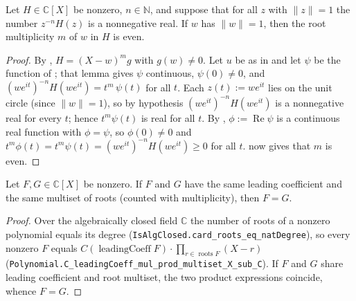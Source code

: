 \begin{lemma}
    \label{lem:circle-root-even}
    Let $H \in \mathbb{C}[X]$ be nonzero, $n \in \mathbb{N}$, and suppose that
    for all $z$ with $\|z\| = 1$ the number $z^{-n}H(z)$ is a nonnegative real.
    If $w$ has $\|w\| = 1$, then the root multiplicity $m$ of $w$ in $H$ is even.
\end{lemma}
\begin{proof}
    By , $H = (X - w)^{m} g$ with $g(w) \neq 0$.
    Let $u$ be as in  and let $\psi$ be the function of
    ; that lemma gives $\psi$ continuous,
    $\psi(0) \neq 0$, and $(w e^{i t})^{-n} H(w e^{i t}) = t^{m}\,\psi(t)$ for all
    $t$. Each $z(t) := w e^{i t}$ lies on the unit circle (since $\|w\| = 1$), so
    by hypothesis $(w e^{i t})^{-n} H(w e^{i t})$ is a nonnegative real for every
    $t$; hence $t^{m}\psi(t)$ is real for all $t$. By ,
    $\phi := \operatorname{Re}\psi$ is a continuous real function with
    $\phi = \psi$, so $\phi(0) \neq 0$ and $t^{m}\phi(t) = t^{m}\psi(t)
    = (w e^{i t})^{-n} H(w e^{i t}) \ge 0$ for all $t$.
     now gives that $m$ is even.
\end{proof}

\begin{lemma}
    \label{lem:eq-of-leadingcoeff-roots}
    \leanok
    Let $F, G \in \mathbb{C}[X]$ be nonzero. If $F$ and $G$ have the same leading
    coefficient and the same multiset of roots (counted with multiplicity), then
    $F = G$.
\end{lemma}
\begin{proof}
    Over the algebraically closed field $\mathbb{C}$ the number of roots of a
    nonzero polynomial equals its degree (\texttt{IsAlgClosed.card\_roots\_eq\_natDegree}),
    so every nonzero $F$ equals
    $C(\operatorname{leadingCoeff} F)\cdot\!\!\prod_{r \in \operatorname{roots} F}\!\!(X - r)$
    (\texttt{Polynomial.C\_leadingCoeff\_mul\_prod\_multiset\_X\_sub\_C}). If $F$
    and $G$ share leading coefficient and root multiset, the two product
    expressions coincide, whence $F = G$.
\end{proof}

